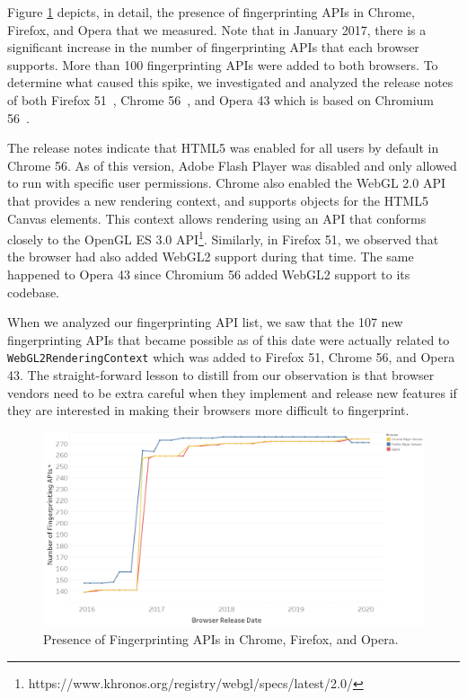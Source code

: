 Figure \ref{fig:fingerprint-apis} depicts, in detail, the presence of
fingerprinting APIs in Chrome, Firefox, and Opera that we measured. Note that
in January 2017, there is a significant increase in the number of
fingerprinting APIs that each browser supports. More than 100
fingerprinting APIs were added to both browsers. To determine what
caused this spike, we investigated and analyzed the release notes of
both Firefox 51~\cite{firefox-51-notes}, Chrome
56~\cite{chrome-56-notes}, and Opera 43 which is based on Chromium 56~\cite{opera-43-notes}.

The release notes indicate that HTML5 was enabled for all users by
default in Chrome 56. As of this version, Adobe Flash Player was
disabled and only allowed to run with specific user permissions.
Chrome also enabled the WebGL 2.0 API that provides a new rendering
context, and supports objects for the HTML5 Canvas elements. This
context allows rendering using an API that conforms closely to the
OpenGL ES 3.0
API\footnote{https://www.khronos.org/registry/webgl/specs/latest/2.0/}.
Similarly, in Firefox 51, we observed that the browser had also added
WebGL2 support during that time. The same happened to Opera 43 since Chromium 56
added WebGL2 support to its codebase.

When we analyzed our fingerprinting API list, we saw that the 107 new
fingerprinting APIs that became possible as of this date were actually
related to \texttt{WebGL2RenderingContext} which was added to Firefox
51, Chrome 56, and Opera 43. The straight-forward lesson to distill from our
observation is that browser vendors need to be extra careful when they
implement and release new features if they are interested in making
their browsers more difficult to fingerprint.

\begin{figure}[ht]
    \centering
    \includegraphics[width=\columnwidth]{figures/Fingerprinting-APIs.png}
    \caption{Presence of Fingerprinting APIs in Chrome, Firefox, and Opera.}
    \label{fig:fingerprint-apis}
\end{figure}

